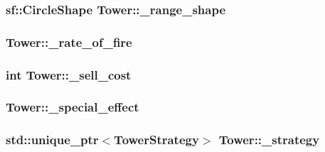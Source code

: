 \hypertarget{class_tower_ae1c75d802145f4b64d6a42820557e708}{
\subsubsection[{\+\_\+range\+\_\+shape}]{\setlength{\rightskip}{0pt plus 5cm}sf\+::\+Circle\+Shape Tower\+::\+\_\+range\+\_\+shape\hspace{0.3cm}{\ttfamily [protected]}}}\label{class_tower_ae1c75d802145f4b64d6a42820557e708}
\hypertarget{class_tower_a746898a9884a60cf09c5b4d0f1fdac2a}{
\subsubsection[{\+\_\+rate\+\_\+of\+\_\+fire}]{ Tower\+::\+\_\+rate\+\_\+of\+\_\+fire\hspace{0.3cm}{\ttfamily [protected]}}}\label{class_tower_a746898a9884a60cf09c5b4d0f1fdac2a}
\hypertarget{class_tower_a7f50414500ec524ccc6ffb7069328d1e}{
\subsubsection[{\+\_\+sell\+\_\+cost}]{\setlength{\rightskip}{0pt plus 5cm}int Tower\+::\+\_\+sell\+\_\+cost\hspace{0.3cm}{\ttfamily [protected]}}}\label{class_tower_a7f50414500ec524ccc6ffb7069328d1e}
\hypertarget{class_tower_ad6a84071c2e7f48386443c469961116c}{
\subsubsection[{\+\_\+special\+\_\+effect}]{ Tower\+::\+\_\+special\+\_\+effect\hspace{0.3cm}{\ttfamily [protected]}}}\label{class_tower_ad6a84071c2e7f48386443c469961116c}
\hypertarget{class_tower_a1fe38f81de5f23293d088c7aa69f3e1e}{
\subsubsection[{\+\_\+strategy}]{\setlength{\rightskip}{0pt plus 5cm}std\+::unique\+\_\+ptr$<${\bf Tower\+Strategy}$>$ Tower\+::\+\_\+strategy\hspace{0.3cm}{\ttfamily [protected]}}}\label{class_tower_a1fe38f81de5f23293d088c7aa69f3e1e}

